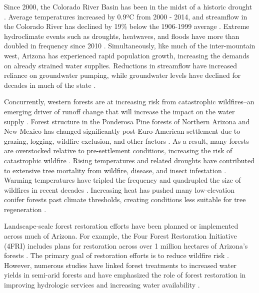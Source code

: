 \documentclass[
  number]{elsarticle}
\begin{document}
Since 2000, the Colorado River Basin has been in the midst of a historic
drought \citep{meko_treering_2022, williams_rapid_2022}. Average
temperatures increased by 0.9ºC from 2000 - 2014, and streamflow in the
Colorado River has declined by 19\% below the 1906-1999 average
\citep{hogan_recent_2024, udall_twentyfirst_2017}. Extreme hydroclimate
events such as droughts, heatwaves, and floods have more than doubled in
frequency since 2010 \citep{bennett_concurrent_2021}. Simultaneously,
like much of the inter-mountain west, Arizona has experienced rapid
population growth, increasing the demands on already strained water
supplies. Reductions in streamflow have increased reliance on
groundwater pumping, while groundwater levels have declined for decades
in much of the state \citep{tadych_historical_2024}.

Concurrently, western forests are at increasing risk from catastrophic
wildfires--an emerging driver of runoff change that will increase the
impact on the water supply \citep{williams_rapid_2022}. Forest structure
in the Ponderosa Pine forests of Northern Arizona and New Mexico has
changed significantly post-Euro-American settlement due to grazing,
logging, wildfire exclusion, and other factors
\citep{covington_southwestern_1994, friederici2013}. As a result, many
forests are overstocked relative to pre-settlement conditions,
increasing the risk of catastrophic wildfire
\citep{allen_ecological_2002}. Rising temperatures and related droughts
have contributed to extensive tree mortality from wildfire, disease, and
insect infestation \citep{berner_tree_2017}. Warming temperatures have
tripled the frequency and quadrupled the size of wildfires in recent
decades \citep{williams_rapid_2022}. Increasing heat has pushed many
low-elevation conifer forests past climate thresholds, creating
conditions less suitable for tree regeneration
\citep{davis_wildfires_2019}.

Landscape-scale forest restoration efforts have been planned or
implemented across much of Arizona. For example, the Four Forest
Restoration Initiative (4FRI) includes plans for restoration across over
1 million hectares of Arizona's forests
\citep{schultz_collaborative_2012}. The primary goal of restoration
efforts is to reduce wildfire risk
\citep{allen_ecological_2002, friederici2013}. However, numerous studies
have linked forest treatments to increased water yields in semi-arid
forests and have emphasized the role of forest restoration in improving
hydrologic services and increasing water availability
\citep{bosch_review_1982, baker_effects_1986, gottfried_moderate_1991, smerdon_overview_2009, zou_streamflow_2010, wyatt_estimating_2013, moreno_modeling_2015, simonit_impact_2015, wyatt_semiarid_2015, odonnell_forest_2018, schenk_impacts_2020, hibbert1979}.
\end{document}
